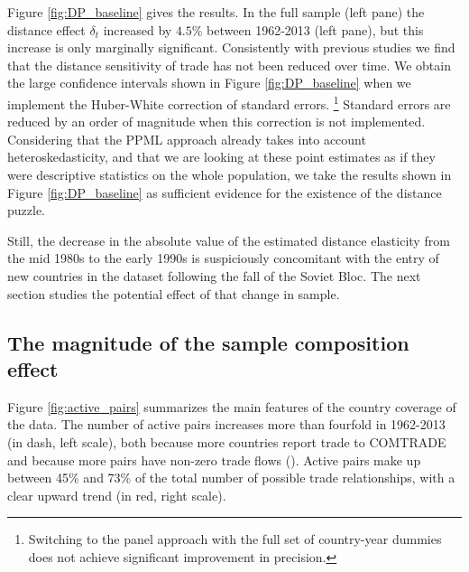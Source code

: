 \documentclass[12pt,twoside,a4paper,notitlepage]{article}
\begin{document}
Figure \ref{fig:DP_baseline} gives the results.
In the full sample (left pane) the distance effect $\delta_t$ increased by $4.5$\% between 1962-2013 (left pane), but this increase is only marginally significant.
Consistently with previous studies we find that the distance sensitivity of trade has not been reduced over time.
We obtain the large confidence intervals shown in Figure \ref{fig:DP_baseline} when we implement the Huber-White correction of standard errors.
\footnote{Switching to the panel approach with the full set of country-year dummies does not achieve significant improvement in precision.}
Standard errors are reduced by an order of magnitude when this correction is not implemented. 
Considering that the PPML approach already takes into account heteroskedasticity, and that we are looking at these point estimates as if they were descriptive statistics on the whole population, we take the results shown in Figure \ref{fig:DP_baseline} as sufficient evidence for the existence of the distance puzzle. 

Still, the decrease in the absolute value of the estimated distance elasticity from the mid 1980s to the early 1990s is suspiciously concomitant with the entry of new countries in the dataset following the fall of the Soviet Bloc. The next section studies the potential effect of that change in sample.

\subsection{The magnitude of the sample composition effect} \label{subsec:data}

Figure \ref{fig:active_pairs} summarizes the main features of the country coverage of the data.
The number of active pairs increases more than fourfold in 1962-2013 (in dash, left scale), both because more countries report trade to COMTRADE and because more pairs have non-zero trade flows (\cite{Helpman2008}).
Active pairs make up between 45\% and 73\% of the total number of possible trade relationships, with a clear upward trend (in red, right scale).
\end{document}

